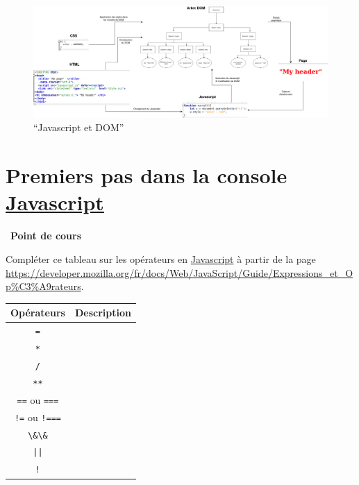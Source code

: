 \documentclass[
  11pt,
]{article}
\newcommand{\passthrough}[1]{#1}
\newcounter{exo}
\newcounter{cours}
\newenvironment{cours}[1]
{\par \medskip   \addtocounter{cours}{1} \noindent  
\begin{bclogo}[arrondi =0.1,  ombre = true, barre=none, logo=\bcbook, marge=4]{~\textbf{Point de cours} \textbf{\thecours} {\itshape #1} }  \par}
{
\end{bclogo}
 \par \bigskip }
\begin{document}
\begin{figure}
\centering
\includegraphics{images/schema-dom.png}
\caption{``Javascript et DOM''}
\end{figure}

\hypertarget{premiers-pas-dans-la-console-javascriptjavascript}{%
\section{\texorpdfstring{Premiers pas dans la console
\href{https://developer.mozilla.org/fr/docs/Glossaire/JavaScript}{Javascript}}{Premiers pas dans la console Javascript}}\label{premiers-pas-dans-la-console-javascriptjavascript}}

\begin{cours}{}

Compléter ce tableau sur les opérateurs en
\href{https://developer.mozilla.org/fr/docs/Glossaire/JavaScript}{Javascript}
à partir de la page
\url{https://developer.mozilla.org/fr/docs/Web/JavaScript/Guide/Expressions_et_Op\%C3\%A9rateurs}.

\begin{longtable}[]{@{}cc@{}}
\toprule
Opérateurs & Description\tabularnewline
\midrule
\endhead
\passthrough{\lstinline!=!} &\tabularnewline
\passthrough{\lstinline!*!} &\tabularnewline
\passthrough{\lstinline!/!} &\tabularnewline
\passthrough{\lstinline!**!} &\tabularnewline
\passthrough{\lstinline!==!} ou \passthrough{\lstinline!===!}
&\tabularnewline
\passthrough{\lstinline"!="} ou \passthrough{\lstinline"!==="}
&\tabularnewline
\passthrough{\lstinline!\&\&!} &\tabularnewline
\passthrough{\lstinline!||!} &\tabularnewline
\passthrough{\lstinline"!"} &\tabularnewline
\bottomrule
\end{longtable}

\end{cours}
\end{document}
